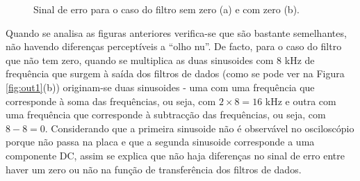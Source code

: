 \documentclass[11pt]{article}
\numberwithin{equation}{section}
\begin{document}
\begin{figure}[H]
	\centering
	\hspace{8mm}
	\vspace{-0.8em}
	\caption{Sinal de erro para o caso do filtro sem zero (a) e com zero (b).}
	\vspace{-0.8em}
\end{figure}

Quando se analisa as figuras anteriores verifica-se que são bastante semelhantes, não havendo diferenças perceptíveis a ``olho nu''. De facto, para o caso do filtro que não tem zero, quando se multiplica as duas sinusoides com 8 kHz de frequência que surgem à saída dos filtros de dados (como se pode ver na Figura \ref{fig:out1}(b)) originam-se duas sinusoides - uma com uma frequência que corresponde à soma das frequências, ou seja, com $2 \times 8 = 16$ kHz e outra com uma frequência que corresponde à subtracção das frequências, ou seja, com $8 - 8 = 0$. Considerando que a primeira sinusoide não é observável no osciloscópio porque não passa na placa e que a segunda sinusoide corresponde a uma componente DC, assim se explica que não haja diferenças no sinal de erro entre haver um zero ou não na função de transferência dos filtros de dados.
\end{document}
